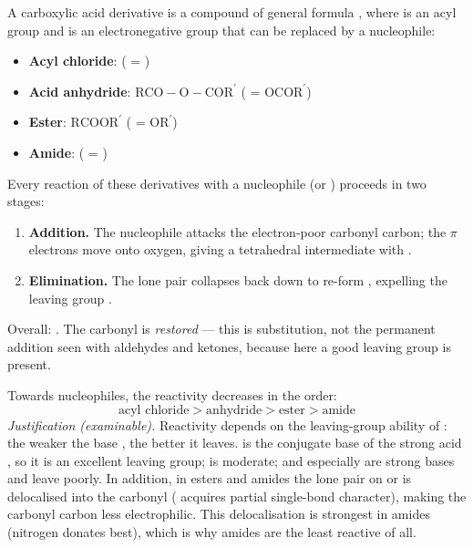\documentclass[11pt]{article}
\newcommand{\cle}[1]{{\popxbold\color{popdark}#1}}
\begin{document}
\begin{definition}
A carboxylic acid derivative is a compound of general formula , where  is an acyl group and  is an electronegative group that can be replaced by a nucleophile:
\begin{itemize}
\item \textbf{Acyl chloride}:  ( = )
\item \textbf{Acid anhydride}: \ensuremath{\mathrm{RCO-O-COR^{\prime}}} ( = \ensuremath{\mathrm{OCOR^{\prime}}})
\item \textbf{Ester}: \ensuremath{\mathrm{RCOOR^{\prime}}} ( = \ensuremath{\mathrm{OR^{\prime}}})
\item \textbf{Amide}:  ( = )
\end{itemize}
\end{definition}

\begin{methode}
Every reaction of these derivatives with a nucleophile  (or ) proceeds in two stages:
\begin{enumerate}
\item \textbf{Addition.} The nucleophile attacks the electron-poor carbonyl carbon; the  $\pi$ electrons move onto oxygen, giving a tetrahedral intermediate with .
\item \textbf{Elimination.} The  lone pair collapses back down to re-form , expelling the leaving group .
\end{enumerate}
Overall: . The carbonyl is \emph{restored} — this is substitution, not the permanent addition seen with aldehydes and ketones, because here a good leaving group is present.
\end{methode}

\begin{propriete}
Towards nucleophiles, the reactivity decreases in the order:
\[ \text{acyl chloride} > \text{anhydride} > \text{ester} > \text{amide} \]
\emph{Justification (examinable).} Reactivity depends on the \cle{leaving-group ability} of : the weaker the base , the better it leaves.  is the conjugate base of the strong acid , so it is an excellent leaving group;  is moderate;  and especially  are strong bases and leave poorly. In addition, in esters and amides the lone pair on  or  is delocalised into the carbonyl ( acquires partial single-bond character), making the carbonyl carbon less electrophilic. This delocalisation is strongest in amides (nitrogen donates best), which is why amides are the least reactive of all.
\end{propriete}
\end{document}
